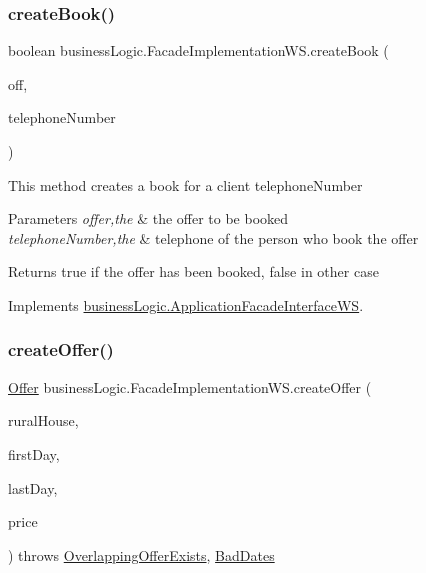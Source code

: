 \subsubsection{\texorpdfstring{createBook()}{createBook()}}
{\footnotesize\ttfamily boolean business\+Logic.\+Facade\+Implementation\+W\+S.\+create\+Book (\begin{DoxyParamCaption}\item[{\mbox{\hyperlink{classdomain_1_1_offer}{Offer}}}]{off,  }\item[{String}]{telephone\+Number }\end{DoxyParamCaption})}

This method creates a book for a client telephone\+Number


\begin{DoxyParams}{Parameters}
{\em offer,the} & the offer to be booked \\
\hline
{\em telephone\+Number,the} & telephone of the person who book the offer \\
\hline
\end{DoxyParams}
\begin{DoxyReturn}{Returns}
true if the offer has been booked, false in other case 
\end{DoxyReturn}


Implements \mbox{\hyperlink{interfacebusiness_logic_1_1_application_facade_interface_w_s_a1fd4f6fccc600ed8127e06fa34a10512}{business\+Logic.\+Application\+Facade\+Interface\+WS}}.

\mbox{\label{classbusiness_logic_1_1_facade_implementation_w_s_ac7b3bdfd0815ea7c787da312de594cce}} 
\subsubsection{\texorpdfstring{createOffer()}{createOffer()}}
{\footnotesize\ttfamily \mbox{\hyperlink{classdomain_1_1_offer}{Offer}} business\+Logic.\+Facade\+Implementation\+W\+S.\+create\+Offer (\begin{DoxyParamCaption}\item[{\mbox{\hyperlink{classdomain_1_1_rural_house}{Rural\+House}}}]{rural\+House,  }\item[{Date}]{first\+Day,  }\item[{Date}]{last\+Day,  }\item[{float}]{price }\end{DoxyParamCaption}) throws \mbox{\hyperlink{classexceptions_1_1_overlapping_offer_exists}{Overlapping\+Offer\+Exists}}, \mbox{\hyperlink{classexceptions_1_1_bad_dates}{Bad\+Dates}}}

